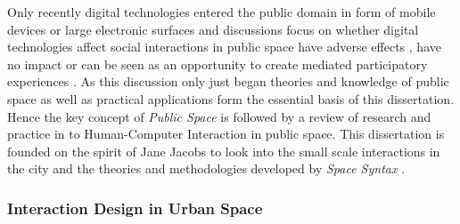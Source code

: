 


Only recently digital technologies entered the public domain in form of mobile devices or large electronic surfaces and discussions focus on whether digital technologies affect social interactions in public space have adverse effects \cite{Turkle_2012}, have no impact \cite{Hampton_2015} or can be seen as an opportunity to create mediated participatory experiences \cite{Gordon_2011}. As this discussion only just began theories and knowledge of public space as well as practical applications form the essential basis of this dissertation. Hence the key concept of \textit{Public Space} is followed by a review of research and practice in to Human-Computer Interaction in public space.     
This dissertation is founded on the spirit of Jane Jacobs to look into the small scale interactions in the city and the theories and methodologies developed by \textit{Space Syntax} \cite{AlSayed2013}.


\subsubsection* {Interaction Design in Urban Space} 

